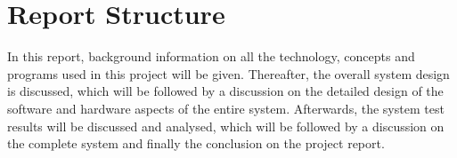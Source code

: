 \section{Report Structure}

In this report, background information on all the technology, concepts and
programs used in this project will be given. Thereafter, the overall system design is
discussed, which will be followed by a discussion on the detailed design of the software
and hardware aspects of the entire system. Afterwards, the system test results will be
discussed and analysed, which will be followed by a discussion on the complete
system and finally the conclusion on the project report.
